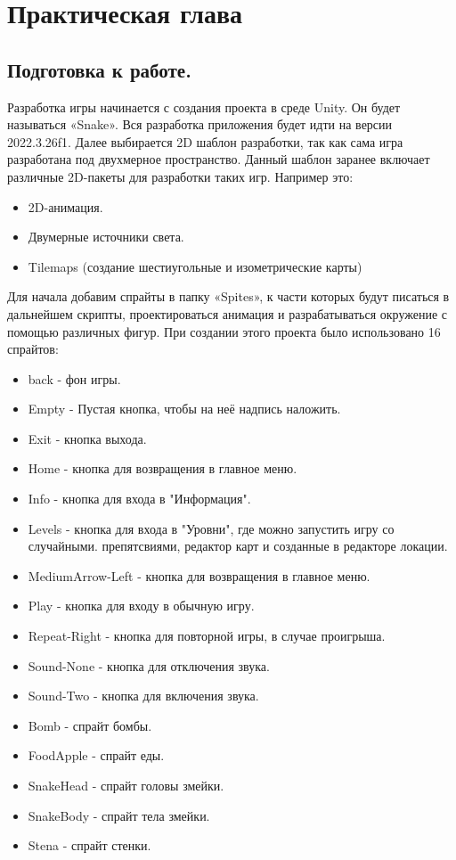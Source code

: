 \chapter{\label{ch:ch02}Практическая глава}

\section{\label{sec:ch02/sec01}Подготовка к работе.}
Разработка игры начинается с создания проекта в среде Unity. Он будет
называться «Snake». Вся разработка приложения будет идти на версии
2022.3.26f1. Далее выбирается 2D шаблон разработки, так как сама игра разработана под двухмерное пространство. Данный шаблон заранее включает
различные 2D-пакеты для разработки таких игр. Например это:
\begin{itemize}
    \item 2D-анимация.
    \item Двумерные источники света.
    \item Tilemaps (создание шестиугольные и изометрические карты)
\end{itemize}
Для начала добавим спрайты в папку «Spites», к части которых будут писаться в дальнейшем скрипты, проектироваться анимация и разрабатываться окружение с помощью различных фигур.
При создании этого проекта было использовано 16 спрайтов:
\begin{itemize}
    \item back - фон игры.
    \item Empty - Пустая кнопка, чтобы на неё надпись наложить.
    \item Exit - кнопка выхода.
    \item Home - кнопка для возвращения в главное меню.
    \item Info - кнопка для входа в "Информация".
    \item Levels - кнопка для входа в "Уровни", где можно запустить игру со случайными. препятсвиями, редактор карт и созданные в редакторе локации.
    \item MediumArrow-Left - кнопка для возвращения в главное меню.
    \item Play - кнопка для входу в обычную игру.
    \item Repeat-Right - кнопка для повторной игры, в случае проигрыша.
    \item Sound-None - кнопка для отключения звука.
    \item Sound-Two - кнопка для включения звука.
    \item Bomb - спрайт бомбы.
    \item FoodApple - спрайт еды.
    \item SnakeHead - спрайт головы змейки.
    \item SnakeBody - спрайт тела змейки.
    \item Stena - спрайт стенки.
\end{itemize}
